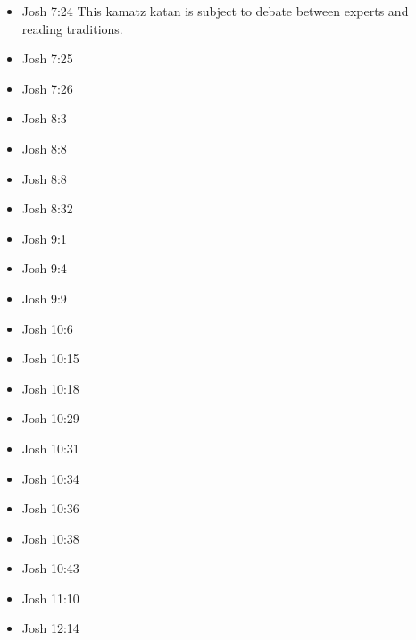 \documentclass[14pt]{article}
\begin{document}
\begin{multicols}{2}
\begin{itemize}
	\item Josh 7:24 This kamatz katan is subject to debate between experts and reading traditions.
	
	\item Josh 7:25
	
	\item Josh 7:26
	
	\item Josh 8:3
	
	\item Josh 8:8
			
			\item Josh 8:8
			
			\item Josh 8:32
			
			\item Josh 9:1
			
			\item Josh 9:4
			
			\item Josh 9:9
			
			\item Josh 10:6
			
			\item Josh 10:15
			
			\item Josh 10:18
			
			\item Josh 10:29
			
			\item Josh 10:31
			
			\item Josh 10:34
			
			\item Josh 10:36
			
			\item Josh 10:38
			
			\item Josh 10:43
			
			\item Josh 11:10
			
			\item Josh 12:14
			

\end{itemize}
\end{multicols}
\end{document}
